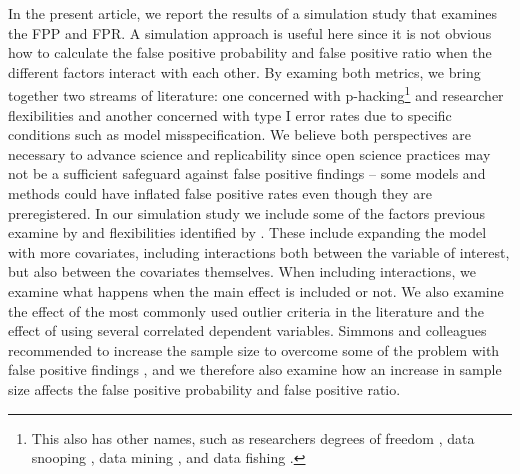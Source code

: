 In the present article, we report the results of a simulation study that examines the FPP and FPR. A simulation approach is useful here since it is not obvious how to calculate the false positive probability and false positive ratio when the different factors interact with each other. By examing both metrics, we bring together two streams of literature: one concerned with p-hacking\footnote{This also has other names, such as researchers degrees of freedom \citep{Simmons2011}, data snooping \citep{white2000reality}, data mining \citep{lovell1983}, and data fishing \citep{selvin1966data}.} \citep{simonsohn2014p} and researcher flexibilities and another concerned with type I error rates due to specific conditions such as model misspecification. We believe both perspectives are necessary to advance science and replicability since open science practices may not be a sufficient safeguard against false positive findings – some models and methods could have inflated false positive rates even though they are preregistered. In our simulation study we include some of the factors previous examine by \cite{Simmons2011} and flexibilities identified by \cite{Wicherts2016}. These include expanding the model with more covariates, including interactions both between the variable of interest, but also between the covariates themselves. When including interactions, we examine what happens when the main effect is included or not. We also examine the effect of the most commonly used outlier criteria in the literature \citep{Leyes2013} and the effect of using several correlated dependent variables. Simmons and colleagues recommended to increase the sample size to overcome some of the problem with false positive findings \citep{Simmons2011}, and we therefore also examine how an increase in sample size affects the false positive probability and false positive ratio. 
